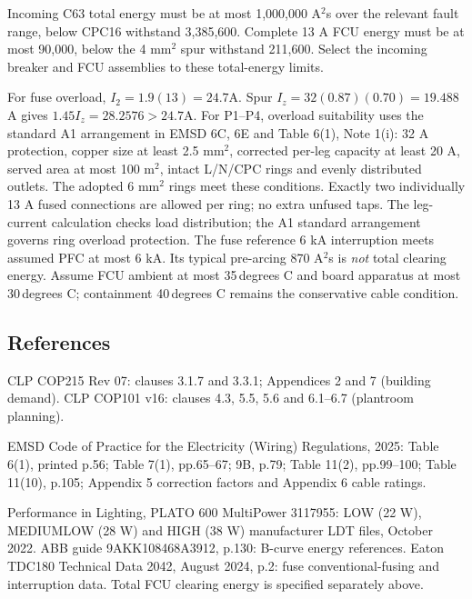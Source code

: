 Incoming C63 total energy must be at most 1,000,000 A$^2$s over the relevant fault range, below CPC16 withstand 3,385,600. Complete 13 A FCU energy must be at most 90,000, below the 4 mm$^2$ spur withstand 211,600. Select the incoming breaker and FCU assemblies to these total-energy limits.

For fuse overload, $I_2=1.9(13)=24.7$A. Spur $I_z=32(0.87)(0.70)=19.488$A gives $1.45I_z=28.2576>24.7$A. For P1--P4, overload suitability uses the standard A1 arrangement in EMSD 6C, 6E and Table 6(1), Note 1(i): 32 A protection, copper size at least 2.5 mm$^2$, corrected per-leg capacity at least 20 A, served area at most 100 m$^2$, intact L/N/CPC rings and evenly distributed outlets. The adopted 6 mm$^2$ rings meet these conditions. Exactly two individually 13 A fused connections are allowed per ring; no extra unfused taps. The leg-current calculation checks load distribution; the A1 standard arrangement governs ring overload protection. The fuse reference 6 kA interruption meets assumed PFC at most 6 kA. Its typical pre-arcing 870 A$^2$s is \emph{not} total clearing energy. Assume FCU ambient at most 35\,degrees C and board apparatus at most 30\,degrees C;  containment 40\,degrees C remains the conservative cable condition.
\subsection*{References}
CLP COP215 Rev 07: clauses 3.1.7 and 3.3.1; Appendices 2 and 7 (building demand). CLP COP101 v16: clauses 4.3, 5.5, 5.6 and 6.1--6.7 (plantroom planning).

EMSD Code of Practice for the Electricity (Wiring) Regulations, 2025: Table 6(1), printed p.56; Table 7(1), pp.65--67; 9B, p.79; Table 11(2), pp.99--100; Table 11(10), p.105; Appendix 5 correction factors and Appendix 6 cable ratings.

Performance in Lighting, PLATO 600 MultiPower 3117955: LOW (22 W), MEDIUMLOW (28 W) and HIGH (38 W) manufacturer LDT files, October 2022. ABB guide 9AKK108468A3912, p.130: B-curve energy references. Eaton TDC180 Technical Data 2042, August 2024, p.2: fuse conventional-fusing and interruption data. Total FCU clearing energy is specified separately above.
